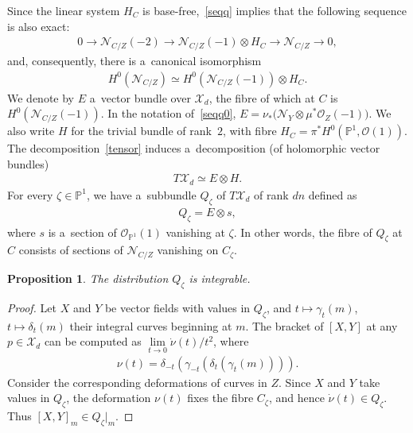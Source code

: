 \documentclass[11pt]{article}
\numberwithin{equation}{section}
\newtheorem{Proposition}[Theorem]{Proposition}
{\theoremstyle{definition}
\newtheorem{Definition}[Theorem]{Definition}
\newtheorem{Remark}[Theorem]{Remark}
}
\begin{document}
Since the linear system $H_C$ is base-free,~\eqref{seqq} implies that the following sequence is also exact:
\begin{gather*}
0\to {\mathcal{N}}_{C/Z}(-2)\to {\mathcal{N}}_{C/Z}(-1)\otimes H_C\to {\mathcal{N}}_{C/Z}\to 0,
\end{gather*}
and, consequently, there is a~canonical isomorphism
\begin{gather}
H^0({\mathcal{N}}_{C/Z})\simeq H^0({\mathcal{N}}_{C/Z}(-1))\otimes H_C.
\label{tensor}
\end{gather}
We denote by $E$ a~vector bundle over ${\mathcal{X}}_d$, the f\/ibre of which at $C$ is $H^0({\mathcal{N}}_{C/Z}(-1))$.
In the notation of~\eqref{seqq0}, $E= \nu_\ast\bigl({\mathcal{N}}_Y\otimes \mu^\ast{\mathcal{O}}_Z(-1)\bigr)$.
We also write $H$ for the trivial bundle of rank~$2$, with f\/ibre $H_C=\pi^\ast H^0({\mathbb{P}}^1,{\mathcal{O}}(1))$.
The decomposition~\eqref{tensor} induces a~decomposition (of holomorphic vector bundles)
\begin{gather*}
T{\mathcal{X}}_d\simeq E\otimes H.
\end{gather*}
For every $\zeta\in {\mathbb{P}}^1$, we have a~subbundle $Q_\zeta$ of $T{\mathcal{X}}_d$ of rank $dn$ def\/ined as
\begin{gather*}
Q_\zeta=E\otimes s,
\end{gather*}
where $s$ is a~section of ${\mathcal{O}}_{{\mathbb{P}}^1}(1)$ vanishing at $\zeta$.
In other words, the f\/ibre of $Q_\zeta$ at $C$ consists of sections of ${\mathcal{N}}_{C/Z}$ vanishing on $C_\zeta$.

\begin{Proposition}\label{integr}
The distribution $Q_\zeta$ is integrable.
\end{Proposition}

\begin{proof}
Let $X$ and $Y$ be vector f\/ields with values in $Q_\zeta$, and $t\mapsto\gamma_t(m)$, $t\mapsto \delta_t(m)$ their
integral curves beginning at $m$.
The bracket of $[X,Y]$ at any $p\in {\mathcal{X}}_d$ can be computed as $\lim\limits_{t\to 0}\dot\nu(t)/t^2$, where
\begin{gather*}
\nu(t)=\delta_{-t}(\gamma_{-t}(\delta_t(\gamma_t(m)))).
\end{gather*}
Consider the corresponding deformations of curves in $Z$.
Since $X$ and $Y$ take values in $Q_\zeta$, the deformation $\nu(t)$ f\/ixes the f\/ibre $C_\zeta$, and hence $\dot\nu(t)\in
Q_\zeta$.
Thus $[X,Y]_m\in {Q_\zeta}|_m$.
\end{proof}
\end{document}
